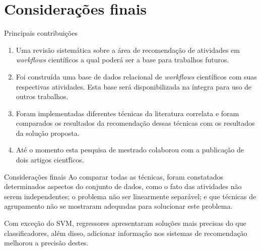 \section{Considerações finais}



  \begin{frame}
  	\begin{block}{Principais contribui\c{c}\~oes}
  		\begin{enumerate}
  			\item Uma revis\~ao sistem\'atica sobre a \'area de recomenda\c{c}\~ao de atividades em \emph{workflows} cient\'ificos a qual poder\'a ser a base para trabalhos futuros.
  			\item Foi constru\'ida uma base de dados relacional de \emph{workflows} cient\'ificos com suas respectivas atividades. Esta base ser\'a disponibilizada na \'integra para uso de outros trabalhos.
  			\item Foram implementadas diferentes t\'ecnicas da literatura correlata e foram comparados os resultados da recomenda\c{c}\~ao dessas t\'ecnicas com os resultados da solu\c{c}\~ao proposta.
  			\item At\'e o momento esta pesquisa de mestrado colaborou com a publica\c{c}\~ao de dois artigos cient\'ficos.
  		\end{enumerate}
  		
  	\end{block}
  \end{frame}
	
	\begin{frame}
		\begin{block}{Considerações finais}
			Ao comparar todas as t\'ecnicas, foram constatados determinados aspectos do conjunto de dados, como o fato das atividades n\~ao serem independentes; o problema n\~ao ser linearmente separ\'avel; e que t\'ecnicas de agrupamento n\~ao se mostraram adequadas para solucionar este problema. 
			
			Com exce\c{c}\~ao do SVM, regressores apresentaram solu\c{c}\~oes mais precisas do que classificadores, al\'em disso, adicionar informa\c{c}\~ao nos sistemas de recomenda\c{c}\~ao melhorou a precis\~ao destes.
		\end{block}
	\end{frame}

